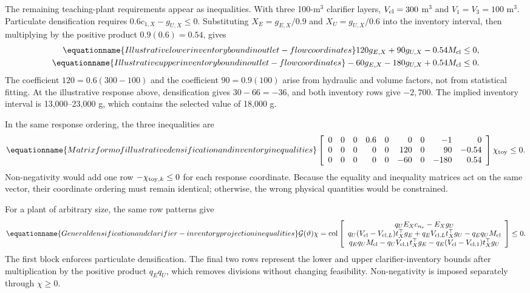 The remaining teaching-plant requirements appear as inequalities. With three 100-m$^3$ clarifier layers, $V_{\rm cl}=300$ m$^3$ and $V_1=V_3=100$ m$^3$. Particulate densification requires $0.6c_{1,X}-g_{U,X}\le0$. Substituting $X_E=g_{E,X}/0.9$ and $X_U=g_{U,X}/0.6$ into the inventory interval, then multiplying by the positive product $0.9(0.6)=0.54$, gives
\begin{align}
\equationname{Illustrative lower inventory bound in outlet-flow coordinates}
120g_{E,X}+90g_{U,X}-0.54M_{\rm cl}&\le0,\\
\equationname{Illustrative upper inventory bound in outlet-flow coordinates}
-60g_{E,X}-180g_{U,X}+0.54M_{\rm cl}&\le0.
\end{align}
The coefficient $120=0.6(300-100)$ and the coefficient $90=0.9(100)$ arise from hydraulic and volume factors, not from statistical fitting. At the illustrative response above, densification gives $30-66=-36$, and both inventory rows give $-2{,}700$. The implied inventory interval is 13{,}000--23{,}000 g, which contains the selected value of 18{,}000 g.

In the same response ordering, the three inequalities are
\begin{equation}
\equationname{Matrix form of illustrative densification and inventory inequalities}
\left[\begin{array}{rrrrrrrrr}
0&0&0&0.6&0&0&0&-1&0\\
0&0&0&0&0&120&0&90&-0.54\\
0&0&0&0&0&-60&0&-180&0.54
\end{array}\right]\chi_{\rm toy}\le0.
\end{equation}
Non-negativity would add one row $-\chi_{{\rm toy},k}\le0$ for each response coordinate. Because the equality and inequality matrices act on the same vector, their coordinate ordering must remain identical; otherwise, the wrong physical quantities would be constrained.

For a plant of arbitrary size, the same row patterns give
\begin{equation}
\equationname{General densification and clarifier-inventory projection inequalities}
\mathcal G(\vartheta)\chi=
\operatorname{col}\left[
\begin{array}{c}
q_UE_Xc_{n_r}-E_Xg_U\\
q_U(V_{\rm cl}-V_{{\rm cl},L})t_X^\top g_E
+q_EV_{{\rm cl},L}t_X^\top g_U-q_Eq_UM_{\rm cl}\\
q_Eq_UM_{\rm cl}-q_UV_{{\rm cl},1}t_X^\top g_E
-q_E(V_{\rm cl}-V_{{\rm cl},1})t_X^\top g_U
\end{array}\right]\le0.
\label{eq:plant_projection_inequalities}
\end{equation}
The first block enforces particulate densification. The final two rows represent the lower and upper clarifier-inventory bounds after multiplication by the positive product $q_Eq_U$, which removes divisions without changing feasibility. Non-negativity is imposed separately through $\chi\ge0$.

